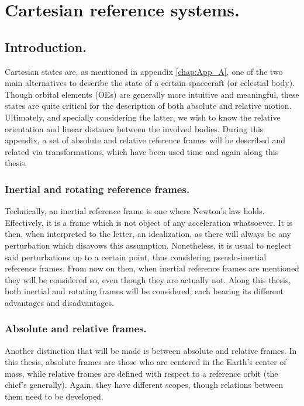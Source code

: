 \chapter{Cartesian reference systems.}
%
\label{app:App_B}
%
\section{Introduction.}
%
\indent Cartesian states are, as mentioned in appendix \ref{chap:App_A}, one of the two main alternatives to describe the state of a certain spacecraft (or celestial body). Though orbital elements (OEs) are generally more intuitive and meaningful, these states are quite critical for the description of both absolute and relative motion. Ultimately, and specially considering the latter, we wish to know the relative orientation and linear distance between the involved bodies. During this appendix, a set of absolute and relative reference frames will be described and related via transformations, which have been used time and again along this thesis.
%
	\subsection{Inertial and rotating reference frames.}
	\indent Technically, an inertial reference frame is one where Newton's law holds. Effectively, it is a frame which is not object of any acceleration whatsoever. It is then, when interpreted to the letter, an idealization, as there will always be any perturbation which disavows this assumption. Nonetheless, it is usual to neglect said perturbations up to a certain point, thus considering pseudo-inertial reference frames. From now on then, when inertial reference frames are mentioned they will be considered so, even though they are actually not. Along this thesis, both inertial and rotating frames will be considered, each bearing its different advantages and disadvantages.
	\subsection{Absolute and relative frames.}
	\indent Another distinction that will be made is between absolute and relative frames. In this thesis, absolute frames are those who are centered in the Earth's center of mass, while relative frames are defined with respect to a reference orbit (the chief's generally). Again, they have different scopes, though relations between them need to be developed.
